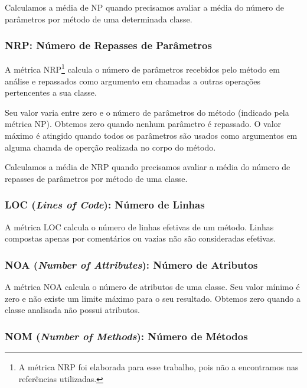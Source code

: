 Calculamos a média de NP quando precisamos avaliar a média do número de parâmetros por método de uma determinada classe.	   
                                   

\subsubsection{NRP: Número de Repasses de Parâmetros}

A métrica NRP\footnote{A métrica NRP foi elaborada para esse trabalho, pois não a encontramos nas referências utilizadas.} calcula o número de parâmetros recebidos pelo método em análise e repassados como argumento em chamadas a outras operações pertencentes a sua classe.                                                    
	
Seu valor varia entre zero e o número de parâmetros do método (indicado pela métrica NP). Obtemos zero quando nenhum parâmetro é repassado. O valor máximo é atingido quando todos os parâmetros são usados como argumentos em alguma chamda de operção realizada no corpo do método. 
                              
Calculamos a média de NRP quando precisamos avaliar a média do número de repasses de parâmetros por método de uma classe.
                        
                                                             
\subsubsection{LOC (\textit{Lines of Code}): Número de Linhas}

A métrica LOC \citep{LK94} calcula o número de linhas efetivas de um método. Linhas compostas apenas por comentários ou vazias não são consideradas efetivas.
 

\subsubsection{NOA (\textit{Number of Attributes}): Número de Atributos}

A métrica NOA calcula o número de atributos de uma classe. Seu valor mínimo é zero e não existe um limite máximo para o seu resultado. Obtemos zero quando a classe analisada não possui atributos.
                         

\subsubsection{NOM (\textit{Number of Methods}): Número de Métodos}


